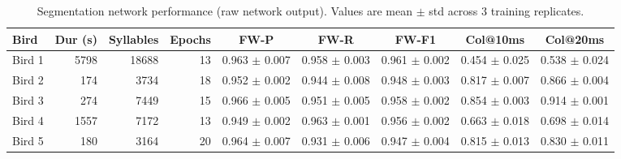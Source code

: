 \begin{table}[ht]
\centering
\caption{Segmentation network performance (raw network output). Values are mean $\pm$ std across 3 training replicates.}
\begin{tabular}{l r r r c c c c c}
\toprule
Bird & Dur (s) & Syllables & Epochs & FW-P & FW-R & FW-F1 & Col@10ms & Col@20ms \\
\midrule
Bird 1 & 5798 & 18688 & 13 & 0.963 $\pm$ 0.007 & 0.958 $\pm$ 0.003 & 0.961 $\pm$ 0.002 & 0.454 $\pm$ 0.025 & 0.538 $\pm$ 0.024 \\
Bird 2 & 174 & 3734 & 18 & 0.952 $\pm$ 0.002 & 0.944 $\pm$ 0.008 & 0.948 $\pm$ 0.003 & 0.817 $\pm$ 0.007 & 0.866 $\pm$ 0.004 \\
Bird 3 & 274 & 7449 & 15 & 0.966 $\pm$ 0.005 & 0.951 $\pm$ 0.005 & 0.958 $\pm$ 0.002 & 0.854 $\pm$ 0.003 & 0.914 $\pm$ 0.001 \\
Bird 4 & 1557 & 7172 & 13 & 0.949 $\pm$ 0.002 & 0.963 $\pm$ 0.001 & 0.956 $\pm$ 0.002 & 0.663 $\pm$ 0.018 & 0.698 $\pm$ 0.014 \\
Bird 5 & 180 & 3164 & 20 & 0.964 $\pm$ 0.007 & 0.931 $\pm$ 0.006 & 0.947 $\pm$ 0.004 & 0.815 $\pm$ 0.013 & 0.830 $\pm$ 0.011 \\
\bottomrule
\end{tabular}
\end{table}
